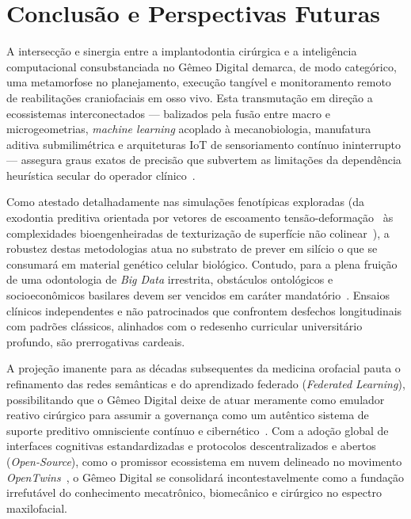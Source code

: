 \section{Conclusão e Perspectivas Futuras}

A intersecção e sinergia entre a implantodontia cirúrgica e a inteligência computacional consubstanciada no Gêmeo Digital demarca, de modo categórico, uma metamorfose no planejamento, execução tangível e monitoramento remoto de reabilitações craniofaciais em osso vivo. Esta transmutação em direção a ecossistemas interconectados — balizados pela fusão entre macro e microgeometrias, \textit{machine learning} acoplado à mecanobiologia, manufatura aditiva submilimétrica e arquiteturas IoT de sensoriamento contínuo ininterrupto — assegura graus exatos de precisão que subvertem as limitações da dependência heurística secular do operador clínico~\cite{khoshfekr2025digital, duggal2026exploring}.

Como atestado detalhadamente nas simulações fenotípicas exploradas (da exodontia preditiva orientada por vetores de escoamento tensão-deformação~\cite{xing2024clinical} às complexidades bioengenheiradas de texturização de superfície não colinear~\cite{alshadidi2024surface}), a robustez destas metodologias atua no substrato de prever em silício o que se consumará em material genético celular biológico. Contudo, para a plena fruição de uma odontologia de \textit{Big Data} irrestrita, obstáculos ontológicos e socioeconômicos basilares devem ser vencidos em caráter mandatório~\cite{du2020marginalized}. Ensaios clínicos independentes e não patrocinados que confrontem desfechos longitudinais com padrões clássicos, alinhados com o redesenho curricular universitário profundo, são prerrogativas cardeais.

A projeção imanente para as décadas subsequentes da medicina orofacial pauta o refinamento das redes semânticas e do aprendizado federado (\textit{Federated Learning}), possibilitando que o Gêmeo Digital deixe de atuar meramente como emulador reativo cirúrgico para assumir a governança como um autêntico sistema de suporte preditivo omnisciente contínuo e cibernético~\cite{techsoc2025precision}. Com a adoção global de interfaces cognitivas estandardizadas e protocolos descentralizados e abertos (\textit{Open-Source}), como o promissor ecossistema em nuvem delineado no movimento \textit{OpenTwins}~\cite{robles2023opentwins}, o Gêmeo Digital se consolidará incontestavelmente como a fundação irrefutável do conhecimento mecatrônico, biomecânico e cirúrgico no espectro maxilofacial.

